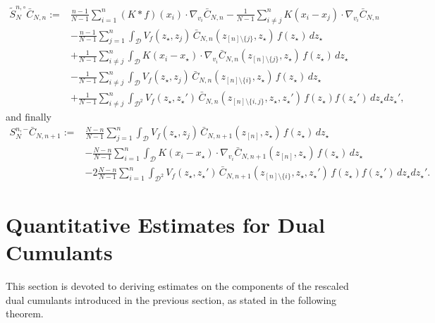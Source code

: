 \documentclass[pdflatex,sn-mathphys-num]{sn-jnl}
\theoremstyle{thmstyleone}%
\theoremstyle{thmstyletwo}%
\theoremstyle{thmstylethree}%
\begin{document}
\begin{align*}
\tilde{S}_N^{n,\circ} \bar{C}_{N,n}
:={}&
\frac{n-1}{N-1}
\sum_{i=1}^n (K\ast f)(x_i)\cdot\nabla_{v_i}\bar{C}_{N,n}
-\frac{1}{N-1}
\sum_{i\ne j}^n
K(x_i-x_j)\cdot\nabla_{v_i}\bar{C}_{N,n}
\\
&-\frac{n-1}{N-1}
\sum_{j=1}^n
\int_{\mathcal{D}} V_f(z_{\star},z_j)\,
\bar{C}_{N,n}(z_{[n]\setminus\{j\}},z_{\star})\,
f(z_{\star})\,dz_{\star}
\\
&+\frac{1}{N-1}
\sum_{i\ne j}^n
\int_{\mathcal{D}}
K(x_i-x_{\star})\cdot\nabla_{v_i}
\bar{C}_{N,n}(z_{[n]\setminus\{j\}},z_{\star})\,
f(z_{\star})\,dz_{\star}
\\
&-\frac{1}{N-1}
\sum_{i\ne j}^n
\int_{\mathcal{D}}
V_f(z_{\star},z_j)\,
\bar{C}_{N,n}(z_{[n]\setminus\{i\}},z_{\star})\,
f(z_{\star})\,dz_{\star}
\\
&+\frac{1}{N-1}
\sum_{i\ne j}^n
\int_{\mathcal{D}^2}
V_f(z_{\star},z_{\star}')\,
\bar{C}_{N,n}(z_{[n]\setminus\{i,j\}},z_{\star},z_{\star}')\,
f(z_{\star})f(z_{\star}')\,dz_{\star}dz_{\star}',
\end{align*}
and finally
\begin{align*}
S_N^{n,-} \bar{C}_{N,n+1}
:={}&
\frac{N-n}{N-1}
\sum_{j=1}^n
\int_{\mathcal{D}}
V_f(z_{\star},z_j)\,
\bar{C}_{N,n+1}(z_{[n]},z_{\star})\,
f(z_{\star})\,dz_{\star}
\\
&-\frac{N-n}{N-1}
\sum_{i=1}^n
\int_{\mathcal{D}}
K(x_i-x_{\star})\cdot\nabla_{v_i}
\bar{C}_{N,n+1}(z_{[n]},z_{\star})\,
f(z_{\star})\,dz_{\star}
\\
&-2\frac{N-n}{N-1}
\sum_{i=1}^n
\int_{\mathcal{D}^2}
V_f(z_{\star},z_{\star}')\,
\bar{C}_{N,n+1}(z_{[n]\setminus\{i\}},z_{\star},z_{\star}')\,
f(z_{\star})f(z_{\star}')\,dz_{\star}dz_{\star}'.
\end{align*}

\section{Quantitative Estimates for Dual Cumulants}\label{sec3}
This section is devoted to deriving estimates on the components of the rescaled dual cumulants introduced in the previous section, as stated in the following theorem.
\end{document}
